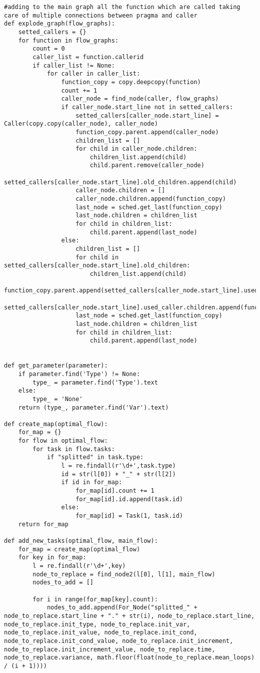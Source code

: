 \documentclass[a4paper,10pt,twoside]{book}
\begin{document}
\begin{lstlisting}[language=CCC, caption=pargraph.py]
#adding to the main graph all the function which are called taking care of multiple connections between pragma and caller
def explode_graph(flow_graphs):
	setted_callers = {}
	for function in flow_graphs:
		count = 0
		caller_list = function.callerid
		if caller_list != None:
			for caller in caller_list:
				function_copy = copy.deepcopy(function)
				count += 1
				caller_node = find_node(caller, flow_graphs)
				if caller_node.start_line not in setted_callers:
					setted_callers[caller_node.start_line] = Caller(copy.copy(caller_node), caller_node)
					function_copy.parent.append(caller_node)
					children_list = []
					for child in caller_node.children:
						children_list.append(child)
						child.parent.remove(caller_node)
						setted_callers[caller_node.start_line].old_children.append(child)
					caller_node.children = []
					caller_node.children.append(function_copy)
					last_node = sched.get_last(function_copy)
					last_node.children = children_list
					for child in children_list:
						child.parent.append(last_node)
				else:
					children_list = []
					for child in setted_callers[caller_node.start_line].old_children:
						children_list.append(child)
					function_copy.parent.append(setted_callers[caller_node.start_line].used_caller)
					setted_callers[caller_node.start_line].used_caller.children.append(function_copy)
					last_node = sched.get_last(function_copy)
					last_node.children = children_list
					for child in children_list:
						child.parent.append(last_node)


def get_parameter(parameter):
	if parameter.find('Type') != None:
		type_ = parameter.find('Type').text
	else:
		type_ = 'None'
	return (type_, parameter.find('Var').text)

def create_map(optimal_flow):
	for_map = {}
	for flow in optimal_flow:
		for task in flow.tasks:
			if "splitted" in task.type:
				l = re.findall(r'\d+',task.type)
				id = str(l[0]) + "_" + str(l[2])
				if id in for_map:
					for_map[id].count += 1
					for_map[id].id.append(task.id)
				else:
					for_map[id] = Task(1, task.id)
	return for_map

def add_new_tasks(optimal_flow, main_flow):
	for_map = create_map(optimal_flow)
	for key in for_map:
		l = re.findall(r'\d+',key)
		node_to_replace = find_node2(l[0], l[1], main_flow)
		nodes_to_add = []

		for i in range(for_map[key].count):
			nodes_to_add.append(For_Node("splitted_" + node_to_replace.start_line + "." + str(i), node_to_replace.start_line, node_to_replace.init_type, node_to_replace.init_var, node_to_replace.init_value, node_to_replace.init_cond, node_to_replace.init_cond_value, node_to_replace.init_increment, node_to_replace.init_increment_value, node_to_replace.time, node_to_replace.variance, math.floor(float(node_to_replace.mean_loops) / (i + 1))))


\end{lstlisting}
\end{document}
